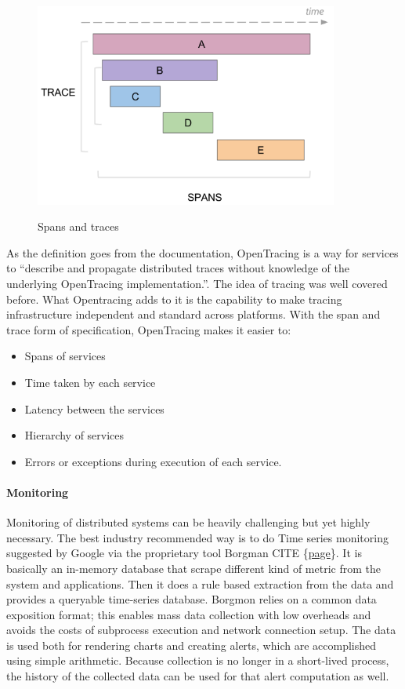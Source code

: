 \documentclass[12pt,titlepage]{article}
\begin{document}
\begin{figure}[!h]
    \caption{Spans and traces}
    \centering
    \includegraphics[width=100mm]{./thesis_images/traces.png}
    \label{fig:traces}
\end{figure}

As the definition goes from the documentation, OpenTracing is a way for services
to “describe and propagate distributed traces without knowledge of the
underlying OpenTracing implementation.”. The idea of tracing was well covered
before. What Opentracing adds to it is the capability to make tracing
infrastructure independent and standard across platforms. With the span and
trace form of specification, OpenTracing makes it easier to:
\begin{itemize}
\item Spans of services
\item Time taken by each service
\item Latency between the services
\item Hierarchy of services
\item Errors or exceptions during execution of each service.
\end{itemize}
\paragraph{Monitoring}
\label{sec:orgae78366}
Monitoring of distributed systems can be heavily challenging but yet highly
necessary. The best industry recommended way is to do Time series monitoring
suggested by Google via the proprietary tool Borgman CITE \{\href{https://landing.google.com/sre/sre-book/chapters/practical-alerting/}{page}\}. It
is basically an in-memory database that scrape different kind of metric from
the system and applications. Then it does a rule based extraction from the data
and provides a queryable time-series database. Borgmon relies on a common data
exposition format; this enables mass data collection with low overheads and
avoids the costs of subprocess execution and network connection setup. The data
is used both for rendering charts and creating alerts, which are accomplished
using simple arithmetic. Because collection is no longer in a short-lived
process, the history of the collected data can be used for that alert
computation as well.
\end{document}
